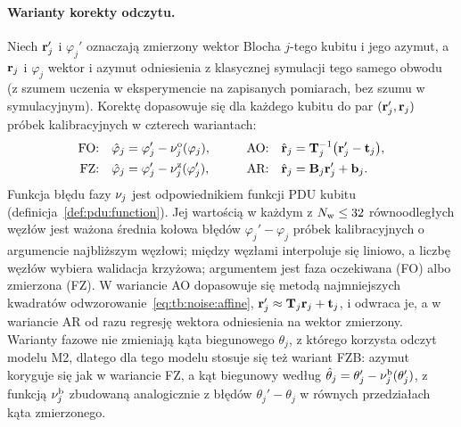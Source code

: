 \paragraph{Warianty korekty odczytu.}
Niech $\mathbf{r}_j'$ i $\varphi_j'$ oznaczają zmierzony wektor Blocha $j$-tego kubitu i jego azymut, a $\mathbf{r}_j$ i $\varphi_j$ wektor i azymut odniesienia z klasycznej symulacji tego samego obwodu (z szumem uczenia w eksperymencie na zapisanych pomiarach, bez szumu w symulacyjnym).
Korektę dopasowuje się dla każdego kubitu do par $(\mathbf{r}_j',\mathbf{r}_j)$ próbek kalibracyjnych w czterech wariantach:
\begin{equation}\label{eq:cls:corrections}
\begin{aligned}
\text{FO:}\quad&\hat{\varphi}_j=\varphi_j'-\nu_j^{\mathrm{o}}(\varphi_j), &\qquad \text{AO:}\quad&\hat{\mathbf{r}}_j=\mathbf{T}_j^{-1}\bigl(\mathbf{r}_j'-\mathbf{t}_j\bigr),\\
\text{FZ:}\quad&\hat{\varphi}_j=\varphi_j'-\nu_j^{\mathrm{z}}(\varphi_j'), &\qquad \text{AR:}\quad&\hat{\mathbf{r}}_j=\mathbf{B}_j\mathbf{r}_j'+\mathbf{b}_j.
\end{aligned}
\end{equation}
Funkcja błędu fazy $\nu_j$ jest odpowiednikiem funkcji PDU kubitu (definicja~\ref{def:pdu:function}).
Jej wartością w każdym z $N_{\mathrm{w}}\leq 32$ równoodległych węzłów jest ważona średnia kołowa błędów $\varphi_j'-\varphi_j$ próbek kalibracyjnych o argumencie najbliższym węzłowi; między węzłami interpoluje się liniowo, a liczbę węzłów wybiera walidacja krzyżowa; argumentem jest faza oczekiwana (FO) albo zmierzona (FZ).
W wariancie AO dopasowuje się metodą najmniejszych kwadratów odwzorowanie~\eqref{eq:tb:noise:affine}, $\mathbf{r}_j'\approx\mathbf{T}_j\mathbf{r}_j+\mathbf{t}_j$, i odwraca je, a w wariancie AR od razu regresję wektora odniesienia na wektor zmierzony.
Warianty fazowe nie zmieniają kąta biegunowego $\theta_j$, z którego korzysta odczyt modelu M2, dlatego dla tego modelu stosuje się też wariant FZB: azymut koryguje się jak w wariancie FZ, a kąt biegunowy według $\hat{\theta}_j=\theta_j'-\nu_j^{\mathrm{b}}(\theta_j')$, z funkcją $\nu_j^{\mathrm{b}}$ zbudowaną analogicznie z błędów $\theta_j'-\theta_j$ w równych przedziałach kąta zmierzonego.
